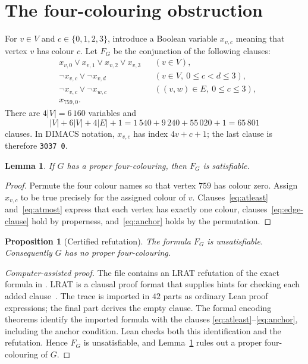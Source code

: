 \documentclass[11pt,a4paper]{article}
\newtheorem{proposition}[theorem]{Proposition}
\newtheorem{lemma}[theorem]{Lemma}
\theoremstyle{remark}
\newcommand{\code}[1]{\texttt{#1}}
\begin{document}
\section{The four-colouring obstruction}\label{sec:sat}

For $v\in V$ and $c\in\{0,1,2,3\}$, introduce a Boolean variable
$x_{v,c}$ meaning that vertex $v$ has colour $c$.
Let $F_G$ be the conjunction of the following clauses:
\begin{align}
 &x_{v,0}\vee x_{v,1}\vee x_{v,2}\vee x_{v,3}
 &&(v\in V),\label{eq:atleast}\\
 &\neg x_{v,c}\vee\neg x_{v,d}
 &&(v\in V,\ 0\leq c<d\leq3),\label{eq:atmost}\\
 &\neg x_{v,c}\vee\neg x_{w,c}
 &&((v,w)\in E,\ 0\leq c\leq3),\label{eq:edge-clause}\\
 &x_{759,0}.&&\label{eq:anchor}
\end{align}
There are $4|V|=6\,160$ variables and
\[
 |V|+6|V|+4|E|+1=1\,540+9\,240+55\,020+1=65\,801
\]
clauses. In DIMACS notation, $x_{v,c}$ has index $4v+c+1$;
the last clause is therefore \code{3037 0}.

\begin{lemma}\label{lem:encoding}
If $G$ has a proper four-colouring, then $F_G$ is satisfiable.
\end{lemma}
\begin{proof}
Permute the four colour names so that vertex $759$ has colour zero.
Assign $x_{v,c}$ to be true precisely for the assigned colour of $v$.
Clauses~\eqref{eq:atleast} and~\eqref{eq:atmost} express that each vertex
has exactly one colour, clauses~\eqref{eq:edge-clause} hold by properness,
and~\eqref{eq:anchor} holds by the permutation.
\end{proof}

\begin{proposition}[Certified refutation]\label{prop:unsat}
The formula $F_G$ is unsatisfiable. Consequently $G$ has no proper
four-colouring.
\end{proposition}
\begin{proof}[Computer-assisted proof]
The file  contains an LRAT refutation of the
exact formula in . LRAT is a clausal proof format
that supplies hints for checking each added clause~\cite{lrat}.
The trace is imported in $42$ parts as ordinary Lean proof expressions;
the final part derives the empty clause. The formal encoding theorems
identify the imported formula with the clauses
\eqref{eq:atleast}--\eqref{eq:anchor}, including the anchor condition.
Lean checks both this identification and the refutation. Hence $F_G$
is unsatisfiable, and Lemma~\ref{lem:encoding} rules out a proper
four-colouring of $G$.
\end{proof}
\end{document}

